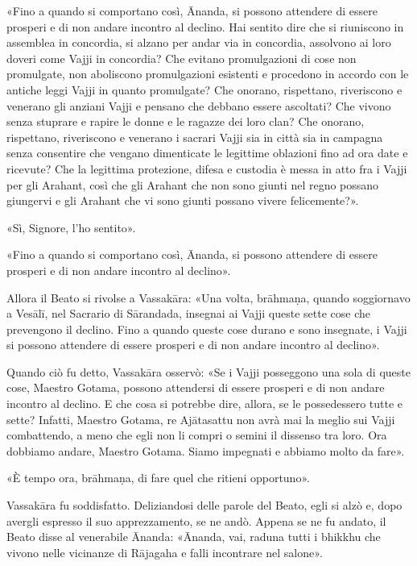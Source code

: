 «Fino a quando si comportano così, Ānanda, si possono attendere di
essere prosperi e di non andare incontro al declino. Hai sentito dire
che si riuniscono in assemblea in concordia, si alzano per andar via in
concordia, assolvono ai loro doveri come Vajji in concordia? Che evitano
promulgazioni di cose non promulgate, non aboliscono promulgazioni
esistenti e procedono in accordo con le antiche leggi Vajji in quanto
promulgate? Che onorano, rispettano, riveriscono e venerano gli anziani
Vajji e pensano che debbano essere ascoltati? Che vivono senza stuprare
e rapire le donne e le ragazze dei loro clan? Che onorano, rispettano,
riveriscono e venerano i sacrari Vajji sia in città sia in campagna
senza consentire che vengano dimenticate le legittime oblazioni fino ad
ora date e ricevute? Che la legittima protezione, difesa e custodia è
messa in atto fra i Vajji per gli Arahant, così che gli Arahant che non
sono giunti nel regno possano giungervi e gli Arahant che vi sono giunti
possano vivere felicemente?».


«Sì, Signore, l’ho sentito».


«Fino a quando si comportano così, Ānanda, si possono attendere di
essere prosperi e di non andare incontro al declino».


Allora il Beato si rivolse a Vassakāra: «Una volta, brāhmaṇa, quando
soggiornavo a Vesālī, nel Sacrario di Sārandada, insegnai ai Vajji
queste sette cose che prevengono il declino. Fino a quando queste cose
durano e sono insegnate, i Vajji si possono attendere di essere prosperi
e di non andare incontro al declino».


Quando ciò fu detto, Vassakāra osservò: «Se i Vajji posseggono una sola
di queste cose, Maestro Gotama, possono attendersi di essere prosperi e
di non andare incontro al declino. E che cosa si potrebbe dire, allora,
se le possedessero tutte e sette? Infatti, Maestro Gotama, re Ajātasattu
non avrà mai la meglio sui Vajji combattendo, a meno che egli non li
compri o semini il dissenso tra loro. Ora dobbiamo andare, Maestro
Gotama. Siamo impegnati e abbiamo molto da fare».


«È tempo ora, brāhmaṇa, di fare quel che ritieni opportuno».


Vassakāra fu soddisfatto. Deliziandosi delle parole del Beato, egli si
alzò e, dopo avergli espresso il suo apprezzamento, se ne andò. Appena
se ne fu andato, il Beato disse al venerabile Ānanda: «Ānanda, vai,
raduna tutti i bhikkhu che vivono nelle vicinanze di Rājagaha e falli
incontrare nel salone».


